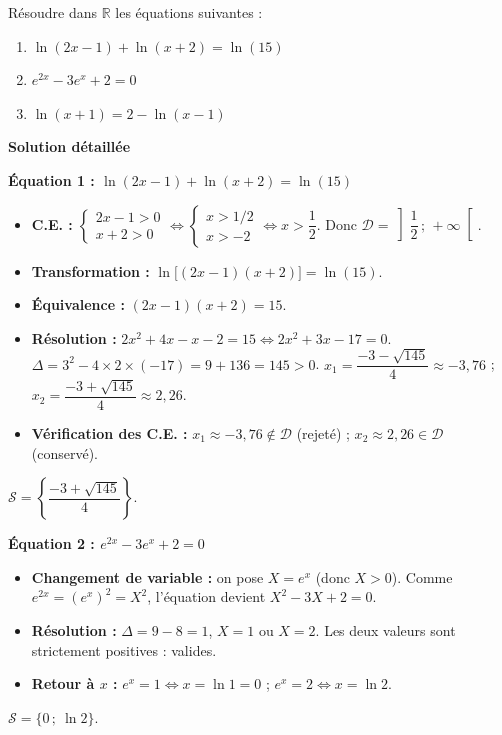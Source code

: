 \documentclass[11pt]{article}
\begin{document}
\begin{exoresolu}
Résoudre dans $\mathbb{R}$ les équations suivantes :
\begin{enumerate}
    \item $\ln(2x-1) + \ln(x+2) = \ln(15)$
    \item $e^{2x} - 3e^x + 2 = 0$
    \item $\ln(x+1) = 2 - \ln(x-1)$
\end{enumerate}
\tcblower
\textbf{Solution détaillée}

\textbf{Équation 1 : $\ln(2x-1) + \ln(x+2) = \ln(15)$}
\begin{itemize}
    \item \textbf{C.E. :} $\begin{cases} 2x-1 > 0 \\ x+2 > 0 \end{cases} \iff \begin{cases} x > 1/2 \\ x > -2 \end{cases} \iff x > \dfrac12$. Donc $\mathcal{D} = \left]\dfrac12\,;\, +\infty\right[$.
    \item \textbf{Transformation :} $\ln\big[(2x-1)(x+2)\big] = \ln(15)$.
    \item \textbf{Équivalence :} $(2x-1)(x+2) = 15$.
    \item \textbf{Résolution :} $2x^2 + 4x - x - 2 = 15 \iff 2x^2 + 3x - 17 = 0$.
    $\Delta = 3^2 - 4\times 2\times(-17) = 9 + 136 = 145 > 0$.
    $x_1 = \dfrac{-3-\sqrt{145}}{4} \approx -3,76$ ; $x_2 = \dfrac{-3+\sqrt{145}}{4} \approx 2,26$.
    \item \textbf{Vérification des C.E. :} $x_1 \approx -3,76 \notin \mathcal{D}$ (rejeté) ; $x_2 \approx 2,26 \in \mathcal{D}$ (conservé).
\end{itemize}
$\mathcal{S} = \left\{ \dfrac{-3+\sqrt{145}}{4} \right\}$.

\textbf{Équation 2 : $e^{2x} - 3e^x + 2 = 0$}
\begin{itemize}
    \item \textbf{Changement de variable :} on pose $X = e^x$ (donc $X > 0$). Comme $e^{2x}=(e^x)^2=X^2$, l'équation devient $X^2 - 3X + 2 = 0$.
    \item \textbf{Résolution :} $\Delta = 9-8=1$, $X=1$ ou $X=2$. Les deux valeurs sont strictement positives : valides.
    \item \textbf{Retour à $x$ :} $e^x = 1 \iff x = \ln 1 = 0$ ; $e^x = 2 \iff x = \ln 2$.
\end{itemize}
$\mathcal{S} = \{ 0\,;\ \ln 2 \}$.


\end{exoresolu}
\end{document}
